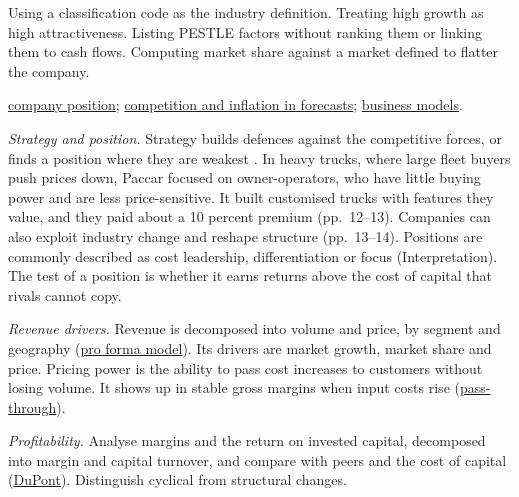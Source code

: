 \begin{qfmethod}
 Using a classification code as the industry definition. Treating high growth as high attractiveness. Listing PESTLE factors without ranking them or linking them to cash flows. Computing market share against a market defined to flatter the company.

 \hyperref[meth:company-position-analysis]{company position}; \hyperref[meth:competition-inflation-forecasting]{competition and inflation in forecasts}; \hyperref[def:business-model-features-types]{business models}.

\end{qfmethod}

\begin{qfmethod}\label{meth:company-position-analysis}
 \emph{Strategy and position.} Strategy builds defences against the competitive forces, or finds a position where they are weakest \citep[p.~12]{five-competitive-forces-2008}. In heavy trucks, where large fleet buyers push prices down, Paccar focused on owner-operators, who have little buying power and are less price-sensitive. It built customised trucks with features they value, and they paid about a 10 percent premium (pp.~12--13). Companies can also exploit industry change and reshape structure (pp.~13--14). Positions are commonly described as cost leadership, differentiation or focus (Interpretation). The test of a position is whether it earns returns above the cost of capital that rivals cannot copy.

\emph{Revenue drivers.} Revenue is decomposed into volume and price, by segment and geography (\hyperref[ex:harbour-pro-forma-model]{pro forma model}). Its drivers are market growth, market share and price. Pricing power is the ability to pass cost increases to customers without losing volume. It shows up in stable gross margins when input costs rise (\hyperref[meth:competition-inflation-forecasting]{pass-through}).

\emph{Profitability.} Analyse margins and the return on invested capital, decomposed into margin and capital turnover, and compare with peers and the cost of capital (\hyperref[meth:return-on-equity-decomposition]{DuPont}). Distinguish cyclical from structural changes.


\end{qfmethod}
